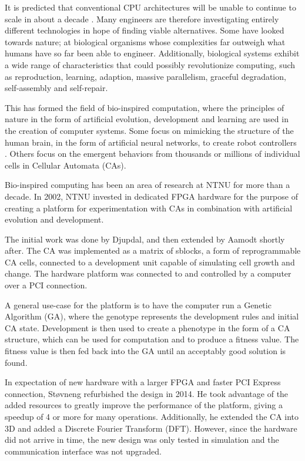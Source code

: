
It is predicted that conventional CPU architectures will be unable to continue to scale in about a decade \cite{esmaeilzadeh2011end}.
Many engineers are therefore investigating entirely different technologies in hope of finding viable alternatives.
Some have looked towards nature; at biological organisms whose complexities far outweigh what humans have so far been able to engineer.
Additionally, biological systems exhibit a wide range of characteristics that could possibly revolutionize computing, such as reproduction, learning, adaption, massive parallelism, graceful degradation, self-assembly and self-repair.


This has formed the field of bio-inspired computation, where the principles of nature in the form of artificial evolution, development and learning are used in the creation of computer systems.
Some focus on mimicking the structure of the human brain, in the form of artificial neural networks, to create robot controllers \cite{degaris2001cbm}.
Others focus on the emergent behaviors from thousands or millions of individual cells in Cellular Automata (CAs).


Bio-inspired computing has been an area of research at NTNU for more than a decade.
In 2002, NTNU invested in dedicated FPGA hardware for the purpose of creating a platform for experimentation with CAs in combination with artificial evolution and development.

The initial work was done by Djupdal, and then extended by Aamodt shortly after.
The CA was implemented as a matrix of sblocks, a form of reprogrammable CA cells, connected to a development unit capable of simulating cell growth and change.
The hardware platform was connected to and controlled by a computer over a PCI connection.

A general use-case for the platform is to have the computer run a Genetic Algorithm (GA), where the genotype represents the development rules and initial CA state.
Development is then used to create a phenotype in the form of a CA structure, which can be used for computation and to produce a fitness value.
The fitness value is then fed back into the GA until an acceptably good solution is found.

In expectation of new hardware with a larger FPGA and faster PCI Express connection, Støvneng refurbished the design in 2014.
He took advantage of the added resources to greatly improve the performance of the platform, giving a speedup of 4 or more for many operations.
Additionally, he extended the CA into 3D and added a Discrete Fourier Transform (DFT).
However, since the hardware did not arrive in time, the new design was only tested in simulation and the communication interface was not upgraded.

